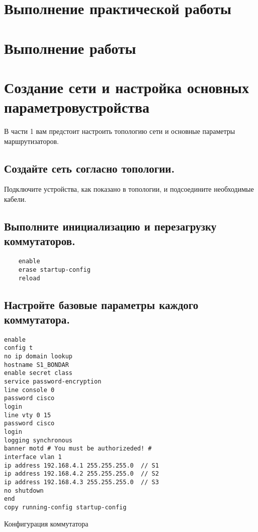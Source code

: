 \section{Выполнение практической работы}

\section*{\LARGE Выполнение работы}

\section{Создание сети и настройка основных параметровустройства}
В части 1 вам предстоит настроить топологию сети
и основные параметры маршрутизаторов.

\subsection{Создайте сеть согласно топологии.}
Подключите устройства, как показано в топологии,
и подсоедините необходимые кабели.

\subsection{Выполните инициализацию и перезагрузку коммутаторов.}

\begin{verbatim}
    enable
    erase startup-config
    reload
\end{verbatim}

\subsection{Настройте базовые параметры каждого коммутатора.}

\begin{verbatim}
enable
config t
no ip domain lookup
hostname S1_BONDAR
enable secret class
service password-encryption
line console 0
password cisco
login
line vty 0 15
password cisco
login
logging synchronous
banner motd # You must be authorizeded! #
interface vlan 1
ip address 192.168.4.1 255.255.255.0  // S1
ip address 192.168.4.2 255.255.255.0  // S2
ip address 192.168.4.3 255.255.255.0  // S3
no shutdown
end
copy running-config startup-config
\end{verbatim}

\begin{image}
	\caption{Конфигурация коммутатора}
	\label{fig:switch:switch:0}
\end{image}

